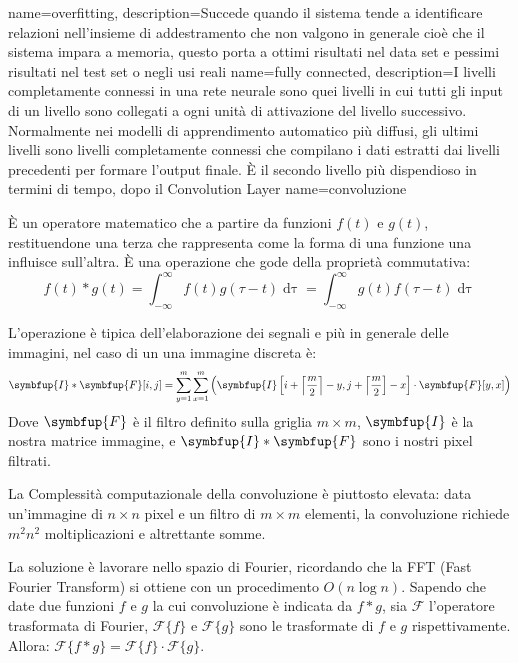 {
    name=overfitting,
    description={Succede quando il sistema tende a identificare relazioni nell’insieme di addestramento che non valgono in generale cioè che il sistema impara a memoria, questo porta a ottimi risultati nel data set e pessimi risultati nel test set o negli usi reali}
}
{
    name={fully connected},
    description={I livelli completamente connessi in una rete neurale sono quei livelli in cui tutti gli input di
            un livello sono collegati a ogni unità di attivazione del livello successivo. Normalmente nei modelli di
            apprendimento automatico più diffusi, gli ultimi livelli sono livelli completamente connessi
            che compilano i dati estratti dai livelli precedenti per formare l’output finale. È il secondo
            livello più dispendioso in termini di tempo, dopo il \gls{Convolution Layer}}
}
{
    name=convoluzione}{
    È un operatore matematico che a partire da funzioni \(f(t)\) e \(g(t)\), restituendone una terza che rappresenta come la forma di una funzione una influisce sull’altra. È una operazione che gode della proprietà commutativa:
    \[ f ( t ) * g ( t ) = \int _ { - \infty } ^ { \infty } f ( t ) g ( \tau - t ) \mathop{\mathrm{d} \tau}  = \int _ { - \infty } ^ { \infty } g ( t ) f ( \tau - t ) \mathop{\mathrm{d} \tau}\]

    L'operazione è tipica dell'elaborazione dei segnali e più in generale delle immagini,  nel caso di un una immagine discreta è:\[ \symbfup { I } * \symbfup{F} [ i , j ] = \sum _ { y = 1 } ^ { m } \sum _ { x = 1 } ^ { m } \left( \symbfup { I } \left[ i + \left\lceil \frac { m } { 2 } \right\rceil - y , j + \left\lceil \frac { m } { 2 } \right] - x \right] \cdot \symbfup { F } [ y , x ] \right) \]
    Dove \(\symbfup{F}\) è il filtro definito sulla griglia \(m \times m\), \(\symbfup{I}\) è la nostra matrice immagine, e \(\symbfup { I } * \symbfup{F}\) sono i nostri pixel filtrati.

    La Complessità
    computazionale  della convoluzione è
    piuttosto elevata: data
    un’immagine di \(n\times n\)
    pixel e un filtro di
    \(m\times m\)
    elementi, la
    convoluzione
    richiede \(m^2 n^2\)
    moltiplicazioni e
    altrettante somme.

    La soluzione è lavorare nello spazio di Fourier, ricordando che la FFT (Fast Fourier Transform) si ottiene con un procedimento \(O(n \log n)\). Sapendo che date due funzioni  \( f \) e \( g \) la cui convoluzione è indicata da \( f * g \), sia \( \mathcal { F } \) l'operatore trasformata di Fourier,  \( \mathcal { F } \{ f \} \) e \( \mathcal { F } \{ g \} \) sono le trasformate di \( f \) e \( g \) rispettivamente. Allora:
    \( \mathcal { F } \{ f * g \} = \mathcal { F } \{ f \} \cdot \mathcal { F } \{ g \} \).}


